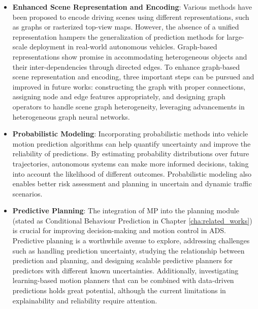 \begin{itemize}
	\item \textbf{Enhanced Scene Representation and Encoding}: Various methods have been proposed to encode driving scenes using different representations, such as graphs or rasterized top-view maps. However, the absence of a unified representation hampers the generalization of prediction methods for large-scale deployment in real-world autonomous vehicles. Graph-based representations show promise in accommodating heterogeneous objects and their inter-dependencies through directed edges. To enhance graph-based scene representation and encoding, three important steps can be pursued and improved in future works: constructing the graph with proper connections, assigning node and edge features appropriately, and designing graph operators to handle scene graph heterogeneity, leveraging advancements in heterogeneous graph neural networks. 

	\item \textbf{Probabilistic Modeling}: Incorporating probabilistic methods into vehicle motion prediction algorithms can help quantify uncertainty and improve the reliability of predictions. By estimating probability distributions over future trajectories, autonomous systems can make more informed decisions, taking into account the likelihood of different outcomes. Probabilistic modeling also enables better risk assessment and planning in uncertain and dynamic traffic scenarios.
	
	\item \textbf{Predictive Planning}: The integration of \ac{MP} into the planning module (stated as Conditional Behaviour Prediction in Chapter \ref{cha:related_works}) is crucial for improving decision-making and motion control in \ac{ADS}. Predictive planning is a worthwhile avenue to explore, addressing challenges such as handling prediction uncertainty, studying the relationship between prediction and planning, and designing scalable predictive planners for predictors with different known uncertainties. Additionally, investigating learning-based motion planners that can be combined with data-driven predictions holds great potential, although the current limitations in explainability and reliability require attention.
	

\end{itemize}
